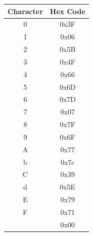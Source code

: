 \begin{widepar}
    \begin{table}
        \begin{tabular}{c | c}
            \toprule
            Character & Hex Code \\

            \midrule
            0 & 0x3F \\
            1 & 0x06 \\
            2 & 0x5B \\
            3 & 0x4F \\
            4 & 0x66 \\
            5 & 0x6D \\
            6 & 0x7D \\
            7 & 0x07 \\
            8 & 0x7F \\
            9 & 0x6F \\
            A & 0x77 \\
            b & 0x7c \\
            C & 0x39 \\
            d & 0x5E \\
            E & 0x79 \\
            F & 0x71 \\
              & 0x00 \\

            \bottomrule
        \end{tabular}
    \end{table}
\end{widepar}